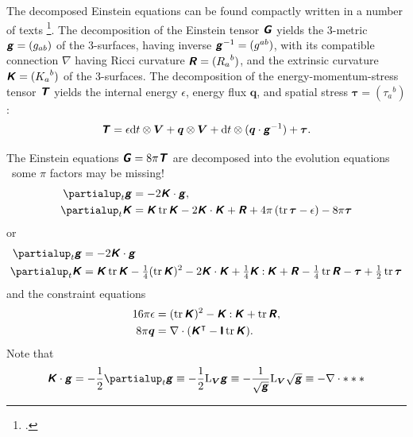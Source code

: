 \documentclass[\ifafour a4paper,12pt,\else a5paper,10pt,\fi%
onecolumn,oneside,article,%
british%
]{memoir}
\theoremstyle{remark}
\theoremstyle{innote}
\newcommand*{\mathte}[1]{\textbf{\textit{\textsf{#1}}}}
\newcommand*{\citep}{\footcites}
\newcommand*{\de}{\partialup}%
\newcommand*{\di}{\mathrm{d}}%
\DeclareMathOperator{\tr}{tr}%
\newcommand*{\con}{\mathbin{:}}%
\renewcommand*{\|}[1][]{\nonscript\,#1\vert\nonscript\;\mathopen{}}
\newcommand*{\sect}{\S}%
\newcommand*{\chap}{ch.}%
\newcommand*{\T}{^\intercal}%
\newcommand*{\puzzle}{{\fontencoding{U}\fontfamily{fontawesometwo}\selectfont\symbol{225}}}
\newcommand{\mynote}[1]{ {\color{notecolour}\puzzle\ #1}}
\newcommand*{\Li}{\mathrm{L}}
\newcommand*{\yGG}{G}
\newcommand*{\yG}{\mathte{\yGG}}
\newcommand*{\yTT}{\tau}
\newcommand*{\yT}{\bm{\yTT}}
\newcommand*{\yTTf}{T}
\newcommand*{\yTf}{\mathte{\yTTf}}
\newcommand*{\ynn}{V}
\newcommand*{\yn}{\bm{\ynn}}
\newcommand*{\ygg}{g}
\newcommand*{\yg}{\mathte{\ygg}}
\newcommand*{\yKK}{K}
\newcommand*{\yK}{\mathte{\yKK}}
\newcommand*{\yRR}{R}
\newcommand*{\yR}{\mathte{\yRR}}
\newcommand*{\ypp}{q}
\newcommand*{\yp}{\bm{\ypp}}
\newcommand*{\ye}{\epsilon}
\newcommand*{\ynab}{\nabla}
\newcommand*{\yI}{\textsf{\textbf{I}}}
\begin{document}
The decomposed Einstein equations can be found compactly written in a
number of texts
\citep[\sect~1.3]{wilsonetal2003_r2007}[\sect~4.3.2]{gourgoulhon2007_r2012}[\chap~2]{alcubierre2008}[\sect~7.2.2]{rezzollaetal2013}.
The decomposition of the Einstein tensor $\yG$ yields the 3-metric
$\yg=(\ygg_{ab})$ of the 3-surfaces, having inverse $\yg^{-1}=(\ygg^{ab})$,
with its compatible connection $\ynab$ having Ricci curvature
$\yR=({\yRR_a}^b)$, and the extrinsic curvature $\yK=({\yKK_a}^b)$ of the
3-surfaces. The decomposition of the energy-momentum-stress tensor $\yTf$ yields the
internal energy $\ye$, energy flux $\yp$, and spatial stress
$\yT=({\yTT_a}^b)$:
\begin{equation}
  \label{eq:decomp_4stress}
  \yTf = \ye \di t \otimes\yn + \yp\otimes\yn + \di t
  \otimes(\yp\cdot\yg^{-1}) + \yT.
\end{equation}

The Einstein equations $\yG = 8\pi\yTf$ are decomposed into the evolution
equations \mynote{some $\pi$ factors may be missing!}
\begin{subequations}\label{eq:evolution_eqns}
  \begin{align}
    \label{eq:dt_metric}
    \de_t \yg &= -2\yK\cdot\yg,
    \\
    \label{eq:dt_curvat}
    \de_t \yK &=  \yK\tr\yK -2 \yK\cdot\yK +\yR + 4\pi\,(\tr\yT-\ye) - 8\pi\yT
  \end{align}
\end{subequations}
or
\begin{subequations}\label{eq:evolution_eqns2}
  \begin{align}
    \label{eq:dt_metric2}
    \de_t \yg &= -2\yK\cdot\yg
    \\
    \label{eq:dt_curvat2}
    \de_t \yK &=  \yK\tr\yK-\tfrac{1}{4}(\tr\yK)^2
                -2 \yK\cdot\yK + \tfrac{1}{4}\yK\con\yK
                +\yR -\tfrac{1}{4}\tr\yR
                -\yT+ \tfrac{1}{2}\tr\yT
  \end{align}
\end{subequations}
and the constraint equations
\begin{subequations}\label{eq:constraint_eqns}
  \begin{align}
    \label{eq:energy_constraint}
    16\pi\ye &=(\tr\yK)^2 - \yK\con\yK + \tr\yR,
    \\
    \label{eq:momentum_constraint}
    8\pi\yp &= \ynab\cdot(\yK\T - \yI\tr\yK).
  \end{align}
\end{subequations}
Note that
\begin{equation}
  \label{eq:curvature_stretching}
  \yK\cdot\yg = -\frac{1}{2}\de_t\yg \equiv
  -\frac{1}{2}  \Li_{\yn}\yg \equiv
  -\frac{1}{\sqrt{\yg}}\Li_{\yn}\sqrt{\yg} \equiv -\ynab\cdot ***
\end{equation}
\end{document}
